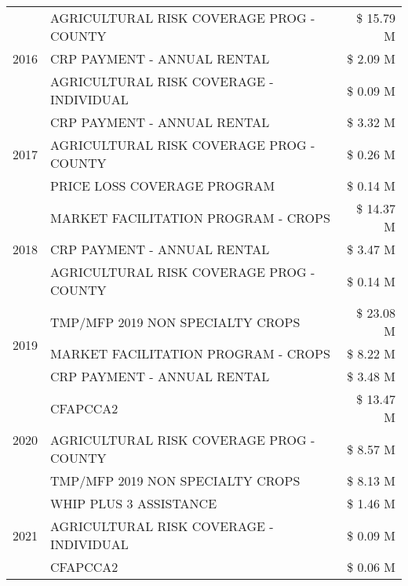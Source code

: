 \begin{tabular}{llr}
\cline{1-3}
\multirow[t]{3}{*}{2016} & AGRICULTURAL RISK COVERAGE PROG - COUNTY      & \$ 15.79 M \\
 & CRP PAYMENT - ANNUAL RENTAL                   & \$ 2.09 M \\
 & AGRICULTURAL RISK COVERAGE - INDIVIDUAL       & \$ 0.09 M \\
\cline{1-3}
\multirow[t]{3}{*}{2017} & CRP PAYMENT - ANNUAL RENTAL & \$ 3.32 M \\
 & AGRICULTURAL RISK COVERAGE PROG - COUNTY & \$ 0.26 M \\
 & PRICE LOSS COVERAGE PROGRAM & \$ 0.14 M \\
\cline{1-3}
\multirow[t]{3}{*}{2018} & MARKET FACILITATION PROGRAM - CROPS & \$ 14.37 M \\
 & CRP PAYMENT - ANNUAL RENTAL & \$ 3.47 M \\
 & AGRICULTURAL RISK COVERAGE PROG - COUNTY & \$ 0.14 M \\
\cline{1-3}
\multirow[t]{3}{*}{2019} & TMP/MFP 2019 NON SPECIALTY CROPS & \$ 23.08 M \\
 & MARKET FACILITATION PROGRAM - CROPS & \$ 8.22 M \\
 & CRP PAYMENT - ANNUAL RENTAL & \$ 3.48 M \\
\cline{1-3}
\multirow[t]{3}{*}{2020} & CFAPCCA2 & \$ 13.47 M \\
 & AGRICULTURAL RISK COVERAGE PROG - COUNTY & \$ 8.57 M \\
 & TMP/MFP 2019 NON SPECIALTY CROPS & \$ 8.13 M \\
\cline{1-3}
\multirow[t]{3}{*}{2021} & WHIP PLUS 3 ASSISTANCE & \$ 1.46 M \\
 & AGRICULTURAL RISK COVERAGE - INDIVIDUAL & \$ 0.09 M \\
 & CFAPCCA2 & \$ 0.06 M \\
\cline{1-3}
\bottomrule
\end{tabular}
